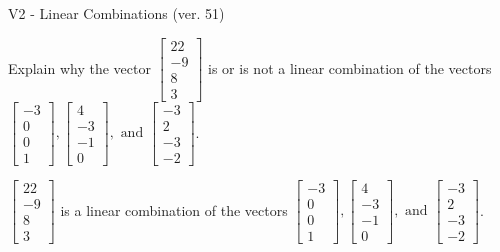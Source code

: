 \begin{exercise}
  \begin{exerciseTitle}V2 - Linear Combinations (ver. 51)\end{exerciseTitle}
  \begin{exerciseStatement}
    Explain why the vector \(\left[\begin{array}{c}
22 \\
-9 \\
8 \\
3
\end{array}\right]\)  is or is not a linear 
	combination of the vectors \(\left[\begin{array}{c}
-3 \\
0 \\
0 \\
1
\end{array}\right] , \left[\begin{array}{c}
4 \\
-3 \\
-1 \\
0
\end{array}\right] , \text{ and } \left[\begin{array}{c}
-3 \\
2 \\
-3 \\
-2
\end{array}\right]\).
	


  \end{exerciseStatement}
  \begin{exerciseAnswer}
   \(\left[\begin{array}{c}
22 \\
-9 \\
8 \\
3
\end{array}\right]\) 
  	 is  
	a linear combination of the vectors \(\left[\begin{array}{c}
-3 \\
0 \\
0 \\
1
\end{array}\right] , \left[\begin{array}{c}
4 \\
-3 \\
-1 \\
0
\end{array}\right] , \text{ and } \left[\begin{array}{c}
-3 \\
2 \\
-3 \\
-2
\end{array}\right]\).

	
  


  \end{exerciseAnswer}
\end{exercise}